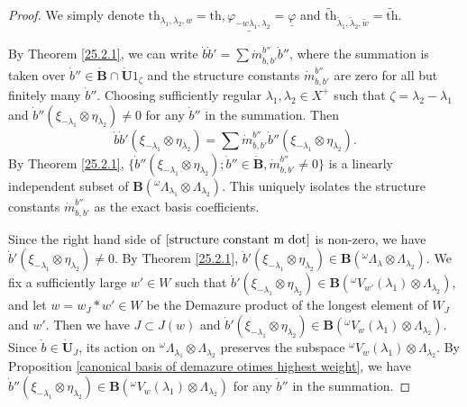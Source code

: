 \documentclass[10pt,a4paper]{amsart}
\begin{document}
\begin{proof}
We simply denote $\mathrm{th}_{\lambda_1,\lambda_2,w}=\mathrm{th},\underline{\varphi_{-w\lambda_1,\lambda_2}}=\underline{\varphi}$ and $\widetilde{\mathrm{th}}_{\tilde{\lambda}_1,\tilde{\lambda}_2,\tilde{w}}=\widetilde{\mathrm{th}}$.

By Theorem \ref{25.2.1}, we can write $\dot{b}\dot{b}'=\sum \dot{m}_{\dot{b},\dot{b}'}^{\dot{b}''}\dot{b}''$, where the summation is taken over $\dot{b}''\in \dot{\mathbf{B}}\cap \dot{\mathbf{U}}1_{\zeta}$ and the structure constants $\dot{m}_{\dot{b},\dot{b}'}^{\dot{b}''}$ are zero for all but finitely many $\dot{b}''$. Choosing sufficiently regular $\lambda_1, \lambda_2 \in X^+$ such that $\zeta=\lambda_2-\lambda_1$ and $\dot{b}''(\xi_{-\lambda_1}\otimes \eta_{\lambda_2})\neq 0$ for any $\dot{b}''$ in the summation. Then 
\begin{equation}\label{structure constant m dot}
\dot{b}\dot{b}'(\xi_{-\lambda_1}\otimes \eta_{\lambda_2})=\sum\dot{m}_{\dot{b},\dot{b}'}^{\dot{b}''}\dot{b}''(\xi_{-\lambda_1}\otimes \eta_{\lambda_2}).    
\end{equation} 
By Theorem \ref{25.2.1}, $\{\dot{b}''(\xi_{-\lambda_1}\otimes \eta_{\lambda_2});\dot{b}'' \in \dot{\mathbf{B}},\dot{m}_{\dot{b},\dot{b}'}^{\dot{b}''}\neq 0\}$ is a linearly independent subset of $\mathbf{B}({^{\omega}\Lambda_{\lambda_1}}\otimes \Lambda_{\lambda_2})$. This uniquely isolates the structure constants $\dot{m}_{\dot{b},\dot{b}'}^{\dot{b}''}$ as the exact basis coefficients.

Since the right hand side of $\eqref{structure constant m dot}$ is non-zero, we have $\dot{b}'(\xi_{-\lambda_1}\otimes \eta_{\lambda_2})\not=0$. By Theorem \ref{25.2.1}, $\dot{b}'(\xi_{-\lambda_1}\otimes \eta_{\lambda_2})\in \mathbf{B}({^{\omega}\Lambda_{\lambda}}\otimes \Lambda_{\lambda_2})$. We fix a sufficiently large $w'\in W$ such that $\dot{b}'(\xi_{-\lambda_1}\otimes \eta_{\lambda_2})\in \mathbf{B}({^{\omega}V_{w'}(\lambda_1)}\otimes \Lambda_{\lambda_2})$, and let $w=w_J*w'\in W$ be the Demazure product of the longest element of $W_J$ and $w'$. Then we have $J\subset J(w)$ and $\dot{b}'(\xi_{-\lambda_1}\otimes \eta_{\lambda_2})\in \mathbf{B}({^{\omega}V_w(\lambda_1)}\otimes \Lambda_{\lambda_2})$. Since $\dot{b}\in \dot{\mathbf{U}}_J$, its action on ${^{\omega}\Lambda_{\lambda_1}}\otimes \Lambda_{\lambda_2}$ preserves the subspace ${^{\omega}V_w(\lambda_1)}\otimes \Lambda_{\lambda_2}$. By Proposition \ref{canonical basis of demazure otimes highest weight}, we have $\dot{b}''(\xi_{-\lambda_1}\otimes \eta_{\lambda_2})\in \mathbf{B}({^{\omega}V_w(\lambda_1)}\otimes \Lambda_{\lambda_2})$ for any $\dot{b}''$ in the summation. 


\end{proof}
\end{document}
